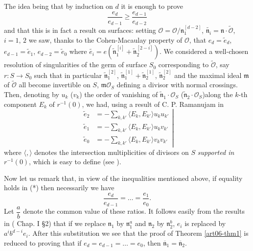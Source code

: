 The idea being that by induction on $d$ it is enough to prove
$$
\frac{e_d}{e_{d-1}} \geqslant \frac{e_{d-1}}{e_{d-2}}
$$
and that this is in fact a result on surfaces: setting $\mathcal{O} = \mathcal{O} / \mathfrak{n}^{[d-2]}_1$, $\tilde{\mathfrak{n}_i} = \mathfrak{n} \cdot \tilde{\mathcal{O}}$, $i=1$, $2$ we saw, thanks to the Cohen-Macaulay property of $\mathcal{O}$, that $e_d = \tilde{e}_d$, $e_{d-1} = \tilde{e}_1$, $e_{d-2} = \tilde{e}_0$ where $\tilde{e_i} = e(\tilde{\mathfrak{n}}^{[i]}_1 + \tilde{\mathfrak{n}}^{[2-i]}_2)$. We considered a well-chosen resolution of singularities of the germ of surface $S_0$ corresponding to $\tilde{\mathcal{O}}$, say $r : S \to S_0$ such that in particular $\tilde{\mathfrak{n}}^{[2]}_1$, $\tilde{\mathfrak{n}}^{[1]}_1 + \tilde{\mathfrak{n}}^{[1]}_2$, $\tilde{\mathfrak{n}}^{[2]}_2$ and the maximal ideal $\mathfrak{m}$ of $\tilde{\mathcal{O}}$ all become invertible on $S$, $\mathfrak{m} \mathcal{O}_S$ defining a divisor with normal crossings. Then, denoting by $u_k$  (\resp $v_k$) the order of vanishing of $\tilde{\mathfrak{n}}_1 \cdot\mathcal{O}_S$ (\resp $\tilde{\mathfrak{n}}_2 \cdot \mathcal{O}_S$)\pageoriginale along the $k$-th component $E_k$ of $r^{-1}(0)$, we had, using a result of C. P. Ramanujam in \cite{art06-keyR}
\begin{equation*}
\left.
\begin{aligned}
\tilde{e}_2 & = - \sum\limits_{k,k'} \langle E_k, E_{k'} \rangle u_k u_{k'}\\
\tilde{e}_1 & = - \sum\limits_{k,k'} \langle E_k, E_{k'} \rangle u_k v_{k'}\\
\tilde{e}_0 & = - \sum\limits_{k,k'} \langle E_k, E_{k'} \rangle v_k v_{k'}
\end{aligned}
\right|\tag{1}
\end{equation*}
where $\langle, \rangle $ denotes the intersection multiplicities of divisors on $S$ {\em supported in $r^{-1}(0)$}, which is easy to define (see \cite{art06-keyR}).

Now let us remark that, in view of the inequalities mentioned above, if equality holds in (*) then necessarily we have 
$$
\frac{e_d}{e_{d-1}} = \ldots = \frac{e_1}{e_0}.
$$
Let $\dfrac{a}{b}$ denote the common value of these ratios. It follows easily from the results in (\cite{art06-keyC.E.W.} Chap. I \S 2) that if we replace $\mathfrak{n}_1$ by $\mathfrak{n}^a_1$ and $\mathfrak{n}_2$ by $\mathfrak{n}^b_2$, $e_i$  is replaced by $a^i b^{d-i} e_i$. After this substitution we see that the proof of Theorem \ref{art06-thm1} is reduced to proving that if $e_d = e_{d-1} = \ldots = e_0$, then $\overline{\mathfrak{n}}_1 = \overline{\mathfrak{n}}_2$. 

